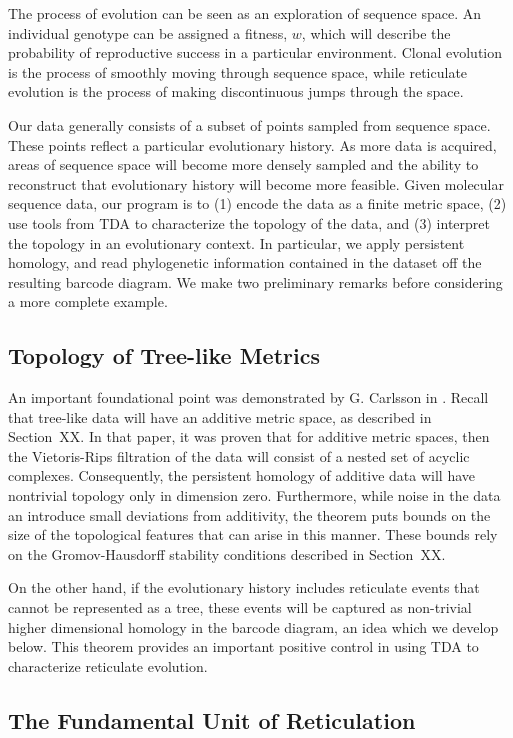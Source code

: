 The process of evolution can be seen as an exploration of sequence space.
An individual genotype can be assigned a fitness, $w$, which will describe the probability of reproductive success in a particular environment.
Clonal evolution is the process of smoothly moving through sequence space, while reticulate evolution is the process of making discontinuous jumps through the space.

Our data generally consists of a subset of points sampled from sequence space.
These points reflect a particular evolutionary history.
As more data is acquired, areas of sequence space will become more densely sampled and the ability to reconstruct that evolutionary history will become more feasible.
Given molecular sequence data, our program is to (1) encode the data as a finite metric space, (2) use tools from TDA to characterize the topology of the data, and (3) interpret the topology in an evolutionary context.
In particular, we apply persistent homology, and read phylogenetic information contained in the dataset off the resulting barcode diagram.
We make two preliminary remarks before considering a more complete example.

\subsection{Topology of Tree-like Metrics}

An important foundational point was demonstrated by G. Carlsson in \cite{Chan:2013}.
Recall that tree-like data will have an additive metric space, as described in Section~XX.
In that paper, it was proven that for additive metric spaces, then the Vietoris-Rips filtration of the data will consist of a nested set of acyclic complexes.
Consequently, the persistent homology of additive data will have nontrivial topology only in dimension zero.
Furthermore, while noise in the data an introduce small deviations from additivity, the theorem puts bounds on the size of the topological features that can arise in this manner.
These bounds rely on the Gromov-Hausdorff stability conditions described in Section~XX.

On the other hand, if the evolutionary history includes reticulate events that cannot be represented as a tree, these events will be captured as non-trivial higher dimensional homology in the barcode diagram, an idea which we develop below.
This theorem provides an important positive control in using TDA to characterize reticulate evolution.

\subsection{The Fundamental Unit of Reticulation}

